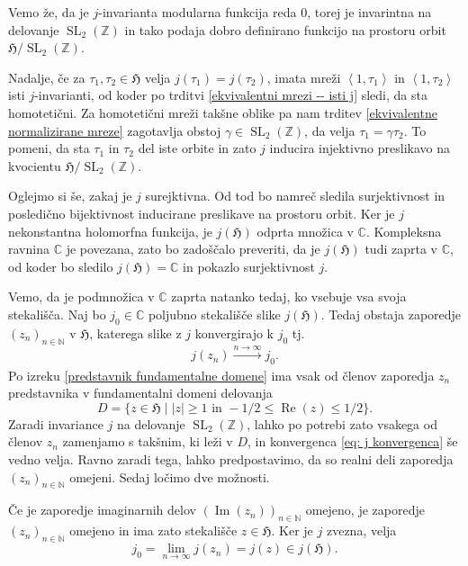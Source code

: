 \documentclass[mat1]{fmfdelo}
\numberwithin{equation}{section}
\newcommand{\N}{\mathbb N}
\newcommand{\Z}{\mathbb Z}
\newcommand{\C}{\mathbb C}
\newcommand{\HH}{\mathfrak{H}}
\newcommand{\SL}{\operatorname{SL}_2(\Z)}
\newcommand{\abs}[1]{\left\lvert #1 \right\rvert}
\newcommand{\lattice}[2]{\left\langle #1, #2 \right\rangle}
\renewcommand\Re{\operatorname{Re}}%
\renewcommand\Im{\operatorname{Im}}%
\newcommand{\tj}{tj.\ }
\theoremstyle{definition}
\begin{document}
\begin{dokaz}
    Vemo že, da je $j$-invarianta modularna funkcija reda $0$, torej je invarintna na delovanje $\SL$ in tako podaja dobro definirano funkcijo na prostoru orbit $\HH/\SL$. 
    
    Nadalje, če za $\tau_1, \tau_2 \in \HH$ velja $j(\tau_1) = j(\tau_2)$, imata mreži $\lattice{1}{\tau_1}$ in $\lattice{1}{\tau_2}$ isti $j$-invarianti, od koder po trditvi \ref{ekvivalentni mrezi -- isti j} sledi, da sta homotetični. Za homotetični mreži takšne oblike pa nam trditev \ref{ekvivalentne normalizirane mreze} zagotavlja obstoj $\gamma \in \SL$, da velja $\tau_1 = \gamma \tau_2$. To pomeni, da sta $\tau_1$ in $\tau_2$ del iste orbite in zato $j$ inducira injektivno preslikavo na kvocientu $\HH/\SL$.

    Oglejmo si še, zakaj je $j$ surejktivna. Od tod bo namreč sledila surjektivnost in posledično bijektivnost inducirane preslikave na prostoru orbit. Ker je $j$ nekonstantna holomorfna funkcija, je $j(\HH)$ odprta množica v $\C$. Kompleksna ravnina $\C$ je povezana, zato bo zadoščalo preveriti, da je $j(\HH)$ tudi zaprta v $\C$, od koder bo sledilo $j(\HH) = \C$ in pokazlo surjektivnost $j$. 

    Vemo, da je podmnožica v $\C$ zaprta natanko tedaj, ko vsebuje vsa svoja stekališča. Naj bo $j_0 \in \C$ poljubno stekališče slike $j(\HH)$. Tedaj obstaja zaporedje $(z_n)_{n\in \N}$ v $\HH$, katerega slike z $j$ konvergirajo k $j_0$ \tj 
    \begin{equation}
        \label{eq: j konvergenca}
        j(z_n) \xrightarrow[]{n \to \infty} j_0. 
    \end{equation}
    Po izreku \ref{predstavnik fundamentalne domene} ima vsak od členov zaporedja $z_n$ predstavnika v fundamentalni domeni delovanja 
    \[
        D = \{z \in \HH \mid \abs{z} \geq 1 \text{ in } -1/2\leq \Re(z) \leq 1/2\}. 
    \]
    Zaradi invariance $j$ na delovanje $\SL$, lahko po potrebi zato vsakega od členov $z_n$ zamenjamo s takšnim, ki leži v $D$, in konvergenca \eqref{eq: j konvergenca} še vedno velja. 
    Ravno zaradi tega, lahko predpostavimo, da so realni deli zaporedja $(z_n)_{n\in \N}$ omejeni. Sedaj ločimo dve možnosti.

    Če je zaporedje imaginarnih delov $(\Im(z_n))_{n \in \N}$ omejeno, je zaporedje $(z_n)_{n\in \N}$ omejeno in ima zato stekališče $z \in \HH$. Ker je $j$ zvezna, velja
    \[
        j_0 = \lim_{n \to \infty}j(z_n) = j(z) \in j(\HH).  
    \] 


\end{dokaz}
\end{document}
